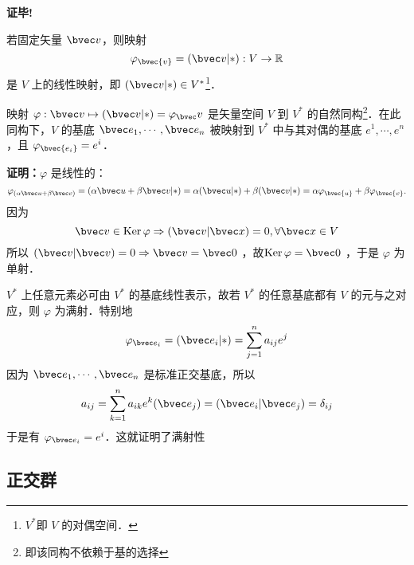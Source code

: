 \textbf{证毕!}

若固定矢量 $\bvec v$，则映射
\begin{equation}
\varphi_\bvec{v}=(\bvec v|*):V\rightarrow\mathbb{R}
\end{equation}
是 $V$ 上的线性映射，即 $(\bvec v|*)\in V^*$\footnote{$V^*$即 $V$ 的对偶空间．}．
\begin{theorem}{}
映射 $\varphi:\bvec v\mapsto (\bvec v|*)=\varphi_\bvec v$ 是矢量空间 $V$ 到 $V^*$ 的自然同构\footnote{即该同构不依赖于基的选择}．在此同构下，$V$ 的基底 $\bvec e_1,\cdots,\bvec e_n$ 被映射到 $V^*$ 中与其对偶的基底 $e^1,\cdots,e^n$，且 $\varphi_\bvec{e_i}=e^i$．
\end{theorem}
\textbf{证明：}$\varphi$ 是线性的：
\begin{equation}
\varphi_{(\alpha\bvec u+\beta\bvec v)}=(\alpha\bvec u+\beta\bvec v|*)=\alpha(\bvec u|*)+\beta(\bvec v|*)=\alpha\varphi_\bvec{u}+\beta\varphi_\bvec{v}.
\end{equation}
因为 
\begin{equation}
\bvec v\in \mathrm{Ker}\,\varphi\Rightarrow(\bvec v|\bvec x)=0,\forall\bvec x\in V
\end{equation}
所以 $(\bvec v|\bvec v)=0\Rightarrow\bvec v=\bvec 0$ ，故$\mathrm{Ker}\,\varphi=\bvec 0$ ，于是 $\varphi$ 为单射．

$V^*$ 上任意元素必可由 $V^*$ 的基底线性表示，故若 $V^*$ 的任意基底都有 $V$ 的元与之对应，则 $\varphi$ 为满射．特别地
\begin{equation}
\varphi_{\bvec e_i}=(\bvec e_i|*)=\sum_{j=1}^{n} a_{ij}e^j
\end{equation}
因为  $\bvec e_1,\cdots,\bvec e_n$ 是标准正交基底，所以
\begin{equation}
a_{ij}=\sum_{k=1}^n a_{ik}e^k(\bvec e_j)=(\bvec e_i|\bvec e_j)=\delta_{ij}
\end{equation}
于是有 $\varphi_{\bvec e_i}=e^i$．这就证明了满射性
\subsection{正交群}

